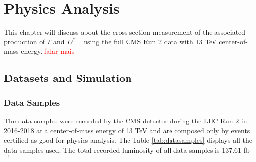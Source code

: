 \chapter{Physics Analysis}

This chapter will discuss about the cross section measurement of the associated production of $\Upsilon$ and $D^{*\pm}$ using the full CMS Run 2 data with 13 TeV center-of-mass energy. \textcolor{red}{falar mais}

\section{Datasets and Simulation}
\subsection{Data Samples}

The data samples were recorded by the CMS detector during the LHC Run 2 in 2016-2018 at a center-of-mass energy of 13 TeV and are composed only by events certified as good for physics analysis. The Table \ref{tab:datasamples} displays all the data samples used. The total recorded luminosity of all data samples is 137.61 fb$^{-1}$

